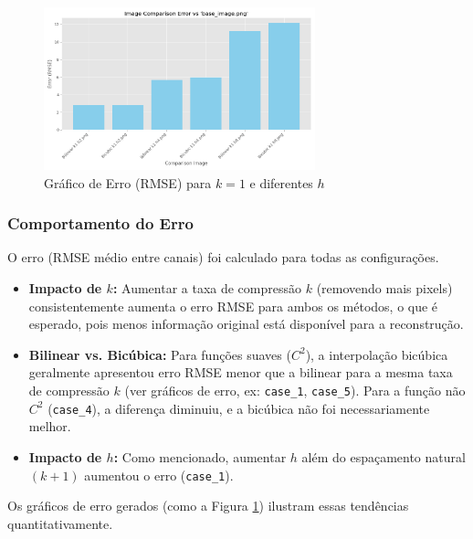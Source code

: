 \documentclass[12pt, a4paper]{article}
\begin{document}
\begin{figure}[H]
    \centering
    \includegraphics[width=0.7\textwidth]{results/case_1/error_graph.png}
    \caption{Gráfico de Erro (RMSE) para $k=1$ e diferentes $h$}
    \label{fig:zoo_error_graph_k1}
\end{figure}

\subsubsection{Comportamento do Erro}
O erro (RMSE médio entre canais) foi calculado para todas as configurações.
\begin{itemize}
    \item \textbf{Impacto de $k$:} Aumentar a taxa de compressão $k$ (removendo mais pixels) consistentemente aumenta o erro RMSE para ambos os métodos, o que é esperado, pois menos informação original está disponível para a reconstrução.
    \item \textbf{Bilinear vs. Bicúbica:} Para funções suaves ($C^2$), a interpolação bicúbica geralmente apresentou erro RMSE menor que a bilinear para a mesma taxa de compressão $k$ (ver gráficos de erro, ex: \texttt{case\_1}, \texttt{case\_5}). Para a função não $C^2$ (\texttt{case\_4}), a diferença diminuiu, e a bicúbica não foi necessariamente melhor.
    \item \textbf{Impacto de $h$:} Como mencionado, aumentar $h$ além do espaçamento natural $(k+1)$ aumentou o erro (\texttt{case\_1}).
\end{itemize}
Os gráficos de erro gerados (como a Figura \ref{fig:zoo_error_graph_k1}) ilustram essas tendências quantitativamente.
\end{document}
